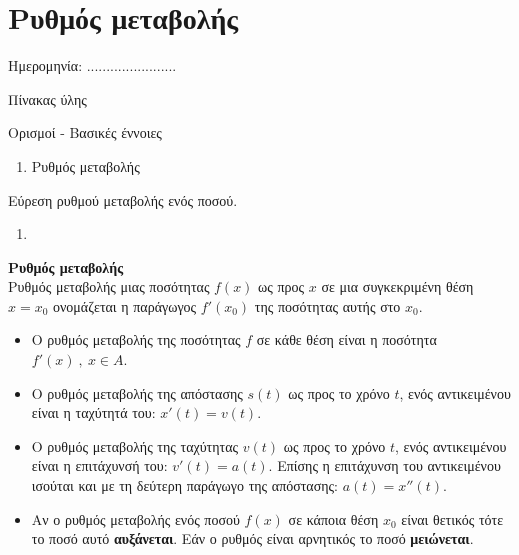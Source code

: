 \documentclass[twoside,nofonts,internet,math,spyros]{frontisthrio}
\newcommand{\myitem}{\stepcounter{enumi}\item[\raisebox{0.5mm}{\faExclamationTriangle}\ \Large$\square$]}
\begin{document}
\section{Ρυθμός μεταβολής}
\begin{flushright}
\faCalendar* Ημερομηνία: .......................
\end{flushright}
\begin{mybox}[mysubtitle]{Πίνακας ύλης}
\begin{tcbraster}[raster columns=1,raster equal height]
\begin{myleftbox}{Ορισμοί - Βασικές έννοιες\ \ \faBook}
\begin{enumerate}[itemsep=0mm]
\item Ρυθμός μεταβολής
\end{enumerate}
\end{myleftbox}
\end{tcbraster}
\begin{multicols}{2}
\begin{todolist}[itemsep=0mm]
\myitem Εύρεση ρυθμού μεταβολής ενός ποσού.
\end{todolist}
\end{multicols}
\begin{multicols}{2}
\begin{enumerate}[itemsep=0mm]
\item 
\end{enumerate}
\end{multicols}
\end{mybox}
\orismoi
\begin{arithmisi}
\item\textbf{Ρυθμός μεταβολής}\\
Ρυθμός μεταβολής μιας ποσότητας $ f(x) $ ως προς $ x $ σε μια συγκεκριμένη θέση $ x=x_0 $ ονομάζεται η παράγωγος $ f'(x_0) $ της ποσότητας αυτής στο $ x_0 $.
\begin{itemize}
\item Ο ρυθμός μεταβολής της ποσότητας $ f $ σε κάθε θέση είναι η ποσότητα $ f'(x) \ ,\ x\in A $.
\item Ο ρυθμός μεταβολής της απόστασης $ s(t) $ ως προς το χρόνο $ t $, ενός αντικειμένου είναι η ταχύτητά του: $ x'(t)=v(t) $.
\item Ο ρυθμός μεταβολής της ταχύτητας $ v(t) $ ως προς το χρόνο $ t $, ενός αντικειμένου είναι η επιτάχυνσή του: $ v'(t)=a(t) $. Επίσης η επιτάχυνση του αντικειμένου ισούται και με τη δεύτερη παράγωγο της απόστασης: $ a(t)=x''(t) $.
\item Αν ο ρυθμός μεταβολής ενός ποσού $ f(x) $ σε κάποια θέση $ x_0 $ είναι θετικός τότε το ποσό αυτό \textbf{αυξάνεται}. Εάν ο ρυθμός είναι αρνητικός το ποσό \textbf{μειώνεται}.
\end{itemize}
\end{arithmisi}
\newpage
\end{document}
